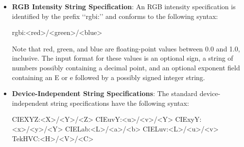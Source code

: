 \documentclass{report}
\begin{document}
\begin{itemize}
\begin{cppcode}
            <red>, <green>, <blue> := h | hh | hhh | hhhh
            h := single hexadecimal digits (case insignificant)
            \end{cppcode}
            \bigbreak \noindent 
            Note that $h$ indicates the value scaled in 4 bits, $hh$ the value scaled in 8 bits, $hhh$ the value scaled in 12 bits, and hhhh the value scaled in 16 bits, respectively.
            \bigbreak \noindent 
            For backward compatibility, an older syntax for RGB Device is supported, but its continued use is not encouraged. The syntax is an initial sharp sign character followed by a numeric specification, in one of the following formats:
            \bigbreak \noindent 
            \begin{cppcode}
                #RGB (4 bits each)
                #RRGGBB (8 bits each)
                #RRRGGGBBB (12 bits each)
                #RRRRGGGGBBBB (16 bits each)
            \end{cppcode}
            \bigbreak \noindent 
            The R, G, and B represent single hexadecimal digits. When fewer than 16 bits each are specified, they represent the most significant bits of the value (unlike the ‘‘rgb:’’ syntax, in which values are scaled). For example, the string ‘‘\#3a7’’ is the same as ‘‘\#3000a0007000’’.
        \item \textbf{RGB Intensity String Specification}: An RGB intensity specification is identified by the prefix ‘‘rgbi:’’ and conforms to the following syntax:
            \bigbreak \noindent 
            \begin{cppcode}
            rgbi:<red>/<green>/<blue>
            \end{cppcode}
            \bigbreak \noindent 
            Note that red, green, and blue are floating-point values between 0.0 and 1.0, inclusive. The input format for these values is an optional sign, a string of numbers possibly containing a decimal point, and an optional exponent field containing an E or e followed by a possibly signed integer string.
        \item \textbf{Device-Independent String Specifications}: The standard device-independent string speciﬁcations have the following syntax:
            \bigbreak \noindent 
            \begin{cppcode}
                CIEXYZ:<X>/<Y>/<Z>
                CIEuvY:<u>/<v>/<Y>
                CIExyY:<x>/<y>/<Y>
                CIELab:<L>/<a>/<b>
                CIELuv:<L>/<u>/<v>
                TekHVC:<H>/<V>/<C>
            \end{cppcode}

\end{itemize}
\end{document}
